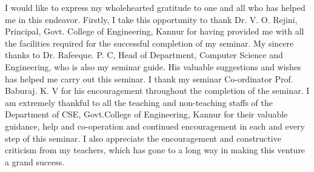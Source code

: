 I would like to express my wholehearted gratitude to one and all who has
helped me in this endeavor. Firstly, I take this opportunity to thank Dr. V.
O. Rejini, Principal, Govt. College of Engineering, Kannur for having
provided me with all the facilities required for the successful completion of my
seminar. My sincere thanks to Dr. Rafeeque. P. C, Head of Department, Computer Science
and Engineering, who is also my seminar guide. His valuable suggestions and wishes has helped me carry out this seminar. I
thank my seminar Co-ordinator Prof. Baburaj. K. V for his encouragement
throughout the completion of the seminar. I am extremely thankful to all the
teaching and non-teaching staffs of the Department of CSE, Govt.College of
Engineering, Kannur for their valuable guidance, help and co-operation and
continued encouragement in each and every step of this seminar. I also appreciate the encouragement and constructive criticism from my teachers, which
has gone to a long way in making this venture a grand success.
